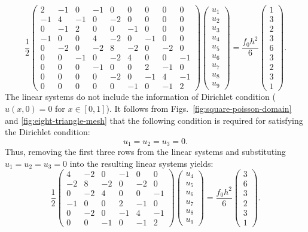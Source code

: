 \[\frac12\begin{pmatrix}
2&-1&0&-1&0&0&0&0&0\\-1&4&-1&0&-2&0&0&0&0\\0&-1&2&0&0&-1&0&0&0\\
-1&0&0&4&-2&0&-1&0&0\\0&-2&0&-2&8&-2&0&-2&0\\0&0&-1&0&-2&4&0&0&-1\\
0&0&0&-1&0&0&2&-1&0\\0&0&0&0&-2&0&-1&4&-1\\0&0&0&0&0&-1&0&-1&2
\end{pmatrix}\begin{pmatrix}u_1\\u_2\\u_3\\u_4\\u_5\\u_6\\u_7\\u_8\\u_9\end{pmatrix}
=\frac{f_0h^2}{6}\begin{pmatrix}1\\3\\2\\3\\6\\3\\2\\3\\1\end{pmatrix}.\]
{The linear systems do not include the information of Dirichlet condition ($u(x,0)=0$ for $x\in[0,1]$). It follows from Figs.\ \ref{fig:square-poisson-domain} and \ref{fig:eight-triangle-mesh} that the following condition is required for satisfying the Dirichlet condition:}
\[u_1=u_2=u_3=0.\]
{Thus, removing the first three rows from the linear systems and substituting $u_1=u_2=u_3=0$ into the resulting linear systems yields:}
\begin{equation}\label{eq:finite-element-square-system}
\frac12\begin{pmatrix}
4&-2&0&-1&0&0\\-2&8&-2&0&-2&0\\0&-2&4&0&0&-1\\
-1&0&0&2&-1&0\\0&-2&0&-1&4&-1\\0&0&-1&0&-1&2
\end{pmatrix}\begin{pmatrix}u_4\\u_5\\u_6\\u_7\\u_8\\u_9\end{pmatrix}
=\frac{f_0h^2}{6}\begin{pmatrix}3\\6\\3\\2\\3\\1\end{pmatrix}.
\end{equation}
